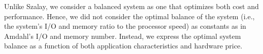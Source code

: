 \documentclass[journal]{IEEEtran}
\begin{document}
Unlike Szalay, we consider a balanced system as one that optimizes both cost and performance. Hence, we did not consider the optimal balance of the system (i.e., the system's I/O and memory ratio to the processor speed) as constants as in Amdahl's I/O and memory number. Instead, we express the optimal system balance  as a function of both application characteristics and hardware price.


\end{document}
